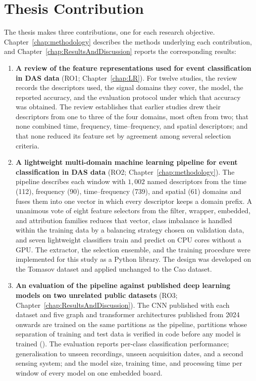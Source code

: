 \section{Thesis Contribution}
\label{sec:ThesisContribution}
The thesis makes three contributions, one for each research objective. Chapter~\ref{chap:methodology} describes the methods underlying each contribution, and Chapter~\ref{chap:ResultsAndDiscussion} reports the corresponding results:
\begin{enumerate}[label=\textbf{C\arabic*.}, leftmargin=*, itemsep=4pt]
	\item \textbf{A review of the feature representations used for event classification in DAS data} (RO1; Chapter~\ref{chap:LR}). For twelve studies, the review records the descriptors used, the signal domains they cover, the model, the reported accuracy, and the evaluation protocol under which that accuracy was obtained. The review establishes that earlier studies drew their descriptors from one to three of the four domains, most often from two; that none combined time, frequency, time--frequency, and spatial descriptors; and that none reduced its feature set by agreement among several selection criteria.
	\item \textbf{A lightweight multi-domain machine learning pipeline for event classification in DAS data} (RO2; Chapter~\ref{chap:methodology}). The pipeline describes each window with $1{,}002$ named descriptors from the time (112), frequency (90), time--frequency (739), and spatial (61) domains and fuses them into one vector in which every descriptor keeps a domain prefix. A unanimous vote of eight feature selectors from the filter, wrapper, embedded, and attribution families reduces that vector, class imbalance is handled within the training data by a balancing strategy chosen on validation data, and seven lightweight classifiers train and predict on CPU cores without a GPU. The extractor, the selection ensemble, and the training procedure were implemented for this study as a Python library. The design was developed on the Tomasov dataset and applied unchanged to the Cao dataset.
	\item \textbf{An evaluation of the pipeline against published deep learning models on two unrelated public datasets} (RO3; Chapter~\ref{chap:ResultsAndDiscussion}). The CNN published with each dataset and five graph and transformer architectures published from 2024 onwards are trained on the same partitions as the pipeline, partitions whose separation of training and test data is verified in code before any model is trained (). The evaluation reports per-class classification performance; generalisation to unseen recordings, unseen acquisition dates, and a second sensing system; and the model size, training time, and processing time per window of every model on one embedded board.
\end{enumerate}

